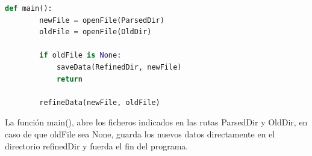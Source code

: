 \begin{lstlisting}[language=Python, caption={Declaración rutas JSONs}]
	def main():
		newFile = openFile(ParsedDir)
		oldFile = openFile(OldDir)
		
		if oldFile is None:
			saveData(RefinedDir, newFile)
			return
		
		refineData(newFile, oldFile)
\end{lstlisting}

La función main(), abre los ficheros indicados en las rutas ParsedDir y OldDir, en caso de que oldFile sea None, guarda los nuevos datos directamente en el directorio refinedDir y fuerda el fin del programa.